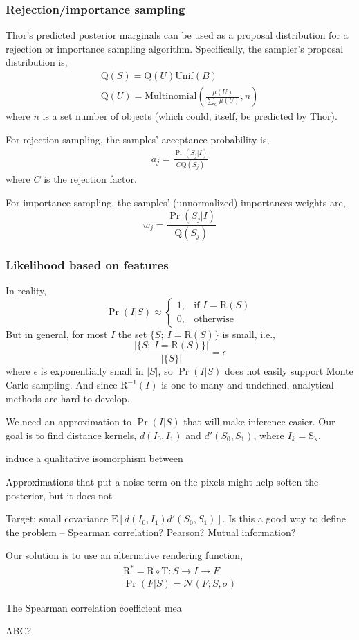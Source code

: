 \documentclass[]{report}
\begin{document}
\subsubsection*{Rejection/importance sampling}
Thor's predicted posterior marginals can be used as a proposal
distribution for a rejection or importance sampling
algorithm. Specifically, the sampler's proposal distribution is,
\begin{align*}
\mathrm{Q}(S) = \mathrm{Q}(U) \mathrm{Unif}(B)\\
\mathrm{Q}(U) = \mathrm{Multinomial}(\frac{\mu(U)}{\sum_U \mu(U)}, n)
\end{align*}
where $n$ is a set number of objects (which could, itself, be predicted by Thor).

For rejection sampling, the samples' acceptance probability is,
\begin{align*}
  a_j = \frac{\Pr(S_j | I)}{C \mathrm{Q}(S_j)}
\end{align*}
where $C$ is the rejection factor.

For importance sampling, the samples' (unnormalized) importances
weights are,
\[
w_j = \frac{\Pr(S_j | I)}{\mathrm{Q}(S_j)}
\]

\subsubsection*{Likelihood based on features}
In reality, 
\[
\Pr(I | S) \approx 
\begin{cases}
  1 , & \text{if } I = \mathrm{R}(S) \\
  0 , & \text{otherwise}
\end{cases}
\]
But in general, for most $I$ the set $\{S;\ I = \mathrm{R}(S)\}$ is
small, i.e., 
\[
\frac{|\{S;\ I = \mathrm{R}(S)\}|}{|\{S\}|} = \epsilon
\]
where $\epsilon$ is exponentially small in $|S|$, so $\Pr(I | S)$ does
not easily support Monte Carlo sampling.  And since
$\mathrm{R}^{-1}(I)$ is one-to-many and undefined, analytical methods
are hard to develop.

We need an approximation to $\Pr(I|S)$ that will make inference
easier.  Our goal is to find distance kernels, $d(I_0, I_1)$ and
$d'(S_0, S_1)$, where $I_k = \mathrm{S_k}$, 


induce a qualitative isomorphism between

Approximations that put a noise term on the pixels might help
soften the posterior, but it does not 

Target: small covariance
$\mathrm{E}[d(I_0, I_1) d'(S_0, S_1)]$.  Is this a good way to define
the problem -- Spearman correlation? Pearson?  Mutual information?

Our solution is to use an alternative rendering function,
\begin{align*}
  \mathrm{R}^* = \mathrm{R} \circ \mathrm{T} : S \rightarrow I \rightarrow F\\
  \Pr(F | S) = \mathcal{N}(F;S, \sigma)
\end{align*}

The Spearman correlation coefficient mea

ABC?
\end{document}
